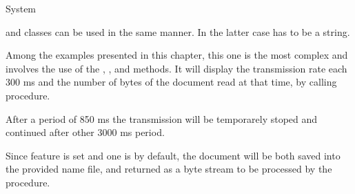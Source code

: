 \documentclass{ozdoc}
\begin{document}
\begin{mozartCODEDISPLAY}
{\mozartSPACE{}\mozartSPACE{}\mozartSPACE{}\mozartLBRACE{}System}\mozartFACEKEYWORD{\mozartHASH{}}\mozartFACETEXT{\mozartNEWLINE
}\end{mozartCODEDISPLAY}




 and  classes can be used in the same manner. In the latter case  has to be a string. \mozartEMPTY





Among the examples presented in this chapter, this one is the most complex and involves the use of the , ,  and  methods. It will display the transmission rate each 300 ms and the number of bytes of the document read at that time, by calling  procedure.

After a period of 850 ms the transmission will be temporarely stoped and continued after other 3000 ms period.

Since  feature is set  and  one is  by default, the document will be both saved into the provided name  file, and returned as a byte stream to be processed by the  procedure. \mozartEMPTY
 \mozartEMPTY


\end{document}
